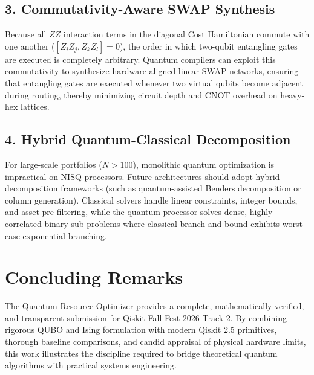 \subsection{3. Commutativity-Aware SWAP Synthesis}
Because all $ZZ$ interaction terms in the diagonal Cost Hamiltonian commute with one another ($[Z_i Z_j, Z_k Z_l] = 0$), the order in which two-qubit entangling gates are executed is completely arbitrary. Quantum compilers can exploit this commutativity to synthesize hardware-aligned linear SWAP networks, ensuring that entangling gates are executed whenever two virtual qubits become adjacent during routing, thereby minimizing circuit depth and CNOT overhead on heavy-hex lattices.

\subsection{4. Hybrid Quantum-Classical Decomposition}
For large-scale portfolios ($N > 100$), monolithic quantum optimization is impractical on NISQ processors. Future architectures should adopt hybrid decomposition frameworks (such as quantum-assisted Benders decomposition or column generation). Classical solvers handle linear constraints, integer bounds, and asset pre-filtering, while the quantum processor solves dense, highly correlated binary sub-problems where classical branch-and-bound exhibits worst-case exponential branching.

\section{Concluding Remarks}
The Quantum Resource Optimizer provides a complete, mathematically verified, and transparent submission for Qiskit Fall Fest 2026 Track 2. By combining rigorous QUBO and Ising formulation with modern Qiskit 2.5 primitives, thorough baseline comparisons, and candid appraisal of physical hardware limits, this work illustrates the discipline required to bridge theoretical quantum algorithms with practical systems engineering.
